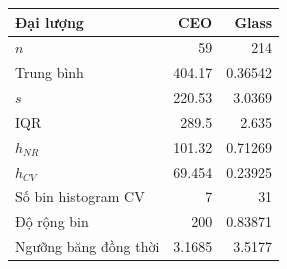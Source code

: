 \begin{center}\begin{tabular}{lrr}\toprule Đại lượng & CEO & Glass\\\midrule
$n$ & 59 & 214\\
Trung bình & 404.17 & 0.36542\\
$s$ & 220.53 & 3.0369\\
IQR & 289.5 & 2.635\\
$h_{NR}$ & 101.32 & 0.71269\\
$h_{CV}$ & 69.454 & 0.23925\\
Số bin histogram CV & 7 & 31\\
Độ rộng bin & 200 & 0.83871\\
Ngưỡng băng đồng thời & 3.1685 & 3.5177\\
\bottomrule\end{tabular}\end{center}